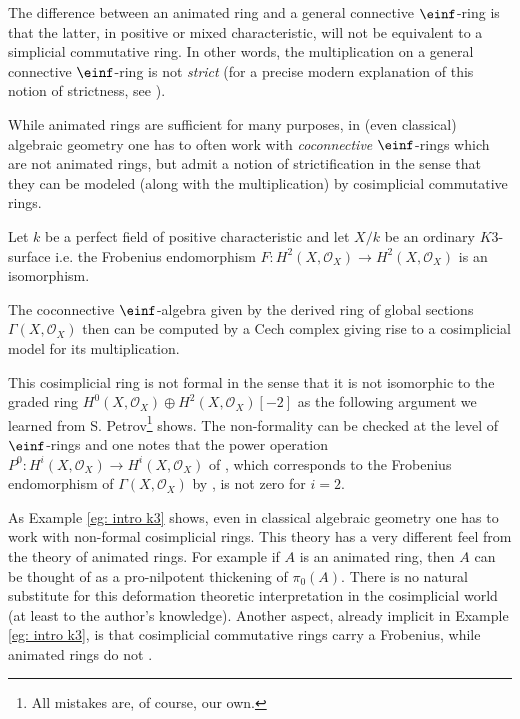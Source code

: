 \documentclass[10pt,reqno]{amsart}
\numberwithin{equation}{section}
\newcommand{\cO}{{\mathcal{O}}}
\begin{document}
The difference between an animated ring and a general connective $\einf$-ring is that the latter, in positive or mixed characteristic, will not be equivalent to a simplicial commutative ring. In other words, the multiplication on a general connective $\einf$-ring is not \emph{strict} (for a precise modern explanation of this notion of strictness, see \cite[\S~25.1.5]{Lur18}).

While animated rings are sufficient for many purposes, in (even classical) algebraic geometry one has to often work with \emph{coconnective} $\einf$-rings which are not animated rings, but admit a notion of strictification in the sense that they can be modeled (along with the multiplication) by cosimplicial commutative rings. 


\begin{example}\label{eg: intro k3}
  Let $k$ be a perfect field of positive characteristic and let $X/k$ be an ordinary $K3$-surface i.e. the Frobenius endomorphism $F:H^2(X,\cO_X)\to H^2(X,\cO_X)$ is an isomorphism. 

  The coconnective $\einf$-algebra given by the derived ring of global sections $\Gamma(X,\cO_X)$ then can be computed by a Cech complex giving rise to a cosimplicial model for its multiplication. 

  This cosimplicial ring is not formal in the sense that it is not isomorphic to the graded ring $H^0(X,\cO_X)\oplus H^2(X,\cO_X)[-2]$ as the following argument we learned from S. Petrov\footnote{All mistakes are, of course, our own.} shows. The non-formality can be checked at the level of $\einf$-rings and one notes that the power operation $P^0\colon H^i(X,\cO_X)\to H^i(X,\cO_X)$ of \cite[Remark 2.27]{LurieDAGXIII}, which corresponds to the Frobenius endomorphism of $\Gamma(X,\cO_X)$ by \cite[Proposition 1.6]{petrov_de_rham}, is not zero for $i=2$. 
\end{example}

As Example \ref{eg: intro k3} shows, even in classical algebraic geometry one has to work with non-formal cosimplicial rings. This theory has a very different feel from the theory of animated rings. For example if $A$ is an animated ring, then $A$ can be thought of as a pro-nilpotent thickening of $\pi_0(A)$. There is no natural substitute for this deformation theoretic interpretation in the cosimplicial world (at least to the author's knowledge). Another aspect, already implicit in Example \ref{eg: intro k3}, is that cosimplicial commutative rings carry a Frobenius, while animated rings do not \cite[Proposition 11.6]{WittVectorGrassmannian}.
\end{document}
